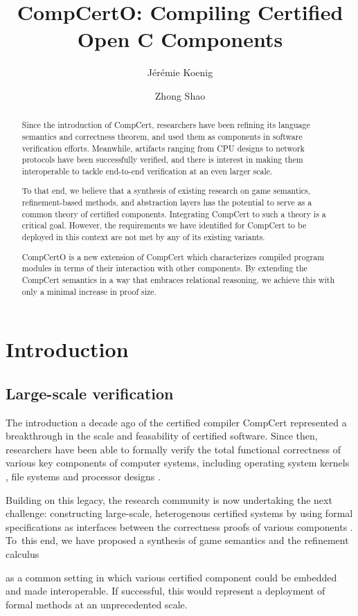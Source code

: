 \documentclass[acmsmall,screen,review,anonymous]{acmart}
\title{CompCertO: Compiling Certified Open C Components} %
\author{J\'er\'emie Koenig}
\affiliation{
  \institution{Yale University}
  \city{New Haven}
  \state{CT}
  \country{USA}
}
\author{Zhong Shao}
\affiliation{
  \institution{Yale University}
  \city{New Haven}
  \state{CT}
  \country{USA}
}
\newcommand{\anon}[2]{#2}
\newcommand{\anon}[2]{#1}
\begin{document}
\begin{abstract} %
Since the introduction of CompCert,
researchers have been refining
its language semantics and correctness theorem,
and used them as components
in software verification efforts.
Meanwhile,
artifacts ranging from CPU designs to network protocols
have been successfully verified,
and there is interest in
making them interoperable
to tackle end-to-end verification
at an even larger scale.

To that end,
\anon{it has been proposed}{we believe} that
a synthesis of existing research on
game semantics,
refinement-based methods, and
abstraction layers
has the potential to serve as a common theory
of certified components.
Integrating CompCert to such a theory
is a critical goal.
However,
the requirements we have identified for
CompCert to be deployed in this context
are not met by any of its existing variants.

CompCertO is
a new extension of CompCert
which characterizes compiled program modules
in terms of their interaction with other components.
By extending the CompCert semantics
in a way that embraces relational reasoning,
we achieve this with only a minimal increase
in proof size.
\end{abstract}

\maketitle

\section{Introduction} %

\subsection{Large-scale verification} %

The introduction a decade ago of
the certified compiler CompCert \cite{compcert}
represented a breakthrough
in the scale and feasability of
certified software.
Since then,
researchers have been able to formally verify the
total functional correctness
of various key components of computer systems,
including
operating system kernels \cite{sel4,popl15},
file systems \cite{fscq} and
processor designs \cite{safe,kami}.

Building on this legacy,
the research community is now undertaking the next challenge:
constructing large-scale, heterogenous certified systems
by using formal specifications as interfaces
between the correctness proofs of various components%
\cite{deepspec}.
To~this end,
\anon{}{we have proposed}
a synthesis of game semantics and the refinement calculus
\anon{has been proposed}{}
\cite{rbgs-cal}
as a common setting
in which various
certified component could be embedded and
made interoperable.
If successful,
this would represent a deployment of formal methods
at an unprecedented scale.
\end{document}
